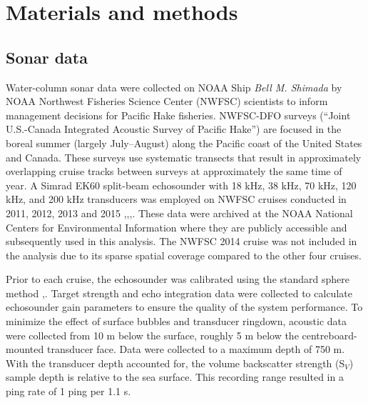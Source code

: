\documentclass[10pt,letterpaper]{article}
\begin{document}
\section*{Materials and methods}

\subsection*{Sonar data}
Water-column sonar data were collected on NOAA Ship \emph{Bell M. Shimada} by NOAA Northwest Fisheries Science Center (NWFSC) scientists to inform management decisions for Pacific Hake fisheries. NWFSC-DFO surveys (“Joint U.S.-Canada Integrated Acoustic Survey of Pacific Hake”) are focused in the boreal summer (largely July–August) along the Pacific coast of the United States and Canada. These surveys use systematic transects that result in approximately overlapping cruise tracks between surveys at approximately the same time of year. A Simrad EK60 split-beam echosounder with 18 kHz, 38 kHz, 70 kHz, 120 kHz, and 200 kHz transducers was employed on NWFSC cruises conducted in 2011, 2012, 2013 and 2015 \cite{nwfsc2011sonar},\cite{nwfsc2012sonar},\cite{nwfsc2013sonar},\cite{nwfsc2015sonar}. These data were archived at the NOAA National Centers for Environmental Information where they are publicly accessible and subsequently used in this analysis. The NWFSC 2014 cruise was not included in the analysis due to its sparse spatial coverage compared to the other four cruises.

Prior to each cruise, the echosounder was calibrated using the standard sphere method \cite{foote1987calibration},\cite{simmonds2008fisheries}. Target strength and echo integration data were collected to calculate echosounder gain parameters to ensure the quality of the system performance. To minimize the effect of surface bubbles and transducer ringdown, acoustic data were collected from 10 m below the surface, roughly 5 m below the centreboard-mounted transducer face. Data were collected to a maximum depth of 750 m. With the transducer depth accounted for, the volume backscatter strength (S$_{V}$) sample depth is relative to the sea surface. This recording range resulted in a ping rate of 1 ping per 1.1 s.
\end{document}
